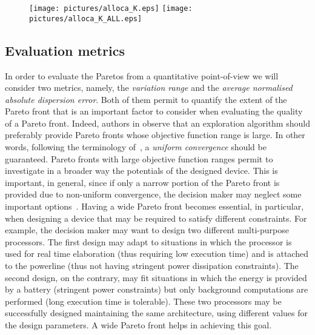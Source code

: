 \begin{figure}
  \begin{center}
    \texttt{[image: pictures/alloca\_K.eps]} 
    \texttt{[image: pictures/alloca\_K\_ALL.eps]} 
  \end{center}
\end{figure}


\subsection{Evaluation metrics}
In order to evaluate the Paretos from a quantitative point-of-view we
will consider two metrics, namely, the \emph{variation range} and the
\emph{average normalised absolute dispersion error}. Both of them permit to quantify the extent of the Pareto front that is an important factor to consider when evaluating the quality of a Pareto front. Indeed, authors in \cite{zitzler_ec00,weise2012evolutionary} observe that an exploration algorithm should preferably provide Pareto fronts whose objective function range is large. In other words, following the terminology of~\cite{weise2012evolutionary}, a \emph{uniform convergence} should be guaranteed.
Pareto fronts with large objective function ranges permit to investigate in a broader way the potentials of the designed device. This is important, in general, since if only a narrow portion of the Pareto front is provided due to non-uniform convergence, the decision maker may neglect some important options~\cite{weise2012evolutionary}. Having a wide Pareto front becomes essential, in particular, when designing a device that may be required to satisfy different constraints. For example, the decision maker may want to design two different multi-purpose processors. The first design may adapt to situations in which the processor is used for real time elaboration (thus requiring low execution time) and is attached to the powerline (thus not having stringent power dissipation constraints). The second design, on the contrary, may fit situations in which the energy is provided by a battery (stringent power constraints) but only background computations are performed (long execution time is tolerable). These two processors may be successfully designed maintaining the same architecture, using different values for the design parameters. A wide Pareto front helps in achieving this goal.

